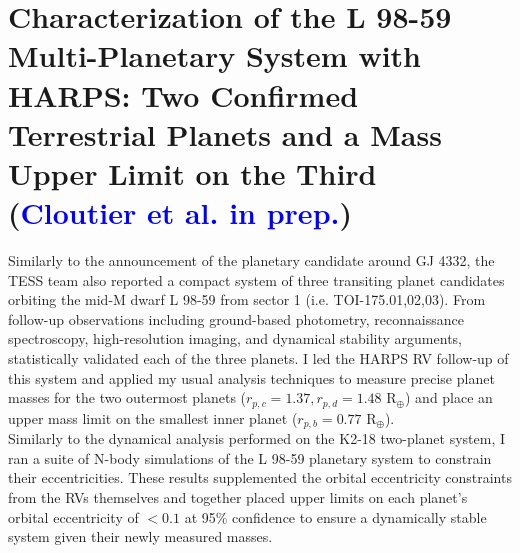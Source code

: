 \section{Characterization of the L 98-59 Multi-Planetary System with HARPS:
  Two Confirmed Terrestrial Planets and a Mass Upper Limit on the Third
  (\textcolor{blue}{Cloutier et al. in prep.})}
Similarly to the announcement of the planetary candidate around GJ 4332, the
TESS team also reported a compact system of three transiting planet
candidates orbiting the mid-M dwarf L 98-59 from sector 1 (i.e.
TOI-175.01,02,03). From follow-up observations including ground-based
photometry, reconnaissance spectroscopy, high-resolution imaging, and
dynamical stability arguments, \cite{kostov19} statistically validated each of
the three planets. I led the HARPS RV follow-up of this system and applied my
usual analysis techniques to measure precise planet masses for the two outermost
planets ($r_{p,c}=1.37, r_{p,d}=1.48$ R$_{\oplus}$) and place an upper mass limit
on the smallest inner planet ($r_{p,b}=0.77$ R$_{\oplus}$). \\

Similarly to the dynamical analysis performed on the K2-18 two-planet system, I
ran a suite of N-body simulations of the L 98-59 planetary system to constrain
their eccentricities. These results supplemented the orbital eccentricity
constraints from the RVs themselves and together placed upper limits on each
planet's orbital eccentricity of $< 0.1$ at 95\% confidence to ensure a
dynamically stable system given their newly measured masses.
